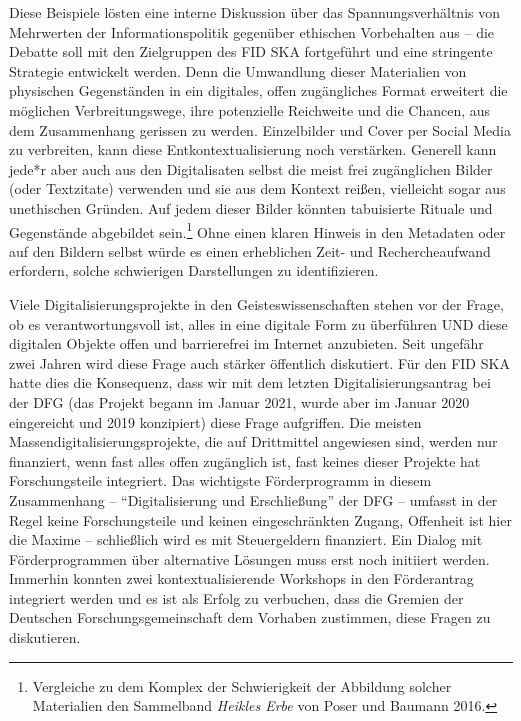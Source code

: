 \documentclass[a4paper,
fontsize=11pt,
oneside,
numbers=noperiodatend,
parskip=half-,
bibliography=totoc,
final
]{scrartcl}
\begin{document}
Diese Beispiele lösten eine interne Diskussion über das
Spannungsverhältnis von Mehrwerten der Informationspolitik gegenüber
ethischen Vorbehalten aus -- die Debatte soll mit den Zielgruppen des
FID SKA fortgeführt und eine stringente Strategie entwickelt werden.
Denn die Umwandlung dieser Materialien von physischen Gegenständen in
ein digitales, offen zugängliches Format erweitert die möglichen
Verbreitungswege, ihre potenzielle Reichweite und die Chancen, aus dem
Zusammenhang gerissen zu werden. Einzelbilder und Cover per Social Media
zu verbreiten, kann diese Entkontextualisierung noch verstärken.
Generell kann jede*r aber auch aus den Digitalisaten selbst die meist
frei zugänglichen Bilder (oder Textzitate) verwenden und sie aus dem
Kontext reißen, vielleicht sogar aus unethischen Gründen. Auf jedem
dieser Bilder könnten tabuisierte Rituale und Gegenstände abgebildet
sein.\footnote{Vergleiche zu dem Komplex der Schwierigkeit der Abbildung
  solcher Materialien den Sammelband \emph{Heikles Erbe} von Poser und
  Baumann 2016.} Ohne einen klaren Hinweis in den Metadaten oder auf den
Bildern selbst würde es einen erheblichen Zeit- und Rechercheaufwand
erfordern, solche schwierigen Darstellungen zu identifizieren.

Viele Digitalisierungsprojekte in den Geisteswissenschaften stehen vor
der Frage, ob es verantwortungsvoll ist, alles in eine digitale Form zu
überführen UND diese digitalen Objekte offen und barrierefrei im
Internet anzubieten. Seit ungefähr zwei Jahren wird diese Frage auch
stärker öffentlich diskutiert. Für den FID SKA hatte dies die
Konsequenz, dass wir mit dem letzten Digitalisierungsantrag bei der DFG
(das Projekt begann im Januar 2021, wurde aber im Januar 2020
eingereicht und 2019 konzipiert) diese Frage aufgriffen. Die meisten
Massendigitalisierungsprojekte, die auf Drittmittel angewiesen sind,
werden nur finanziert, wenn fast alles offen zugänglich ist, fast keines
dieser Projekte hat Forschungsteile integriert. Das wichtigste
Förderprogramm in diesem Zusammenhang -- \enquote{Digitalisierung und
Erschließung} der DFG -- umfasst in der Regel keine Forschungsteile und
keinen eingeschränkten Zugang, Offenheit ist hier die Maxime --
schließlich wird es mit Steuergeldern finanziert. Ein Dialog mit
Förderprogrammen über alternative Lösungen muss erst noch initiiert
werden. Immerhin konnten zwei kontextualisierende Workshops in den
Förderantrag integriert werden und es ist als Erfolg zu verbuchen, dass
die Gremien der Deutschen Forschungsgemeinschaft dem Vorhaben zustimmen,
diese Fragen zu diskutieren.
\end{document}
